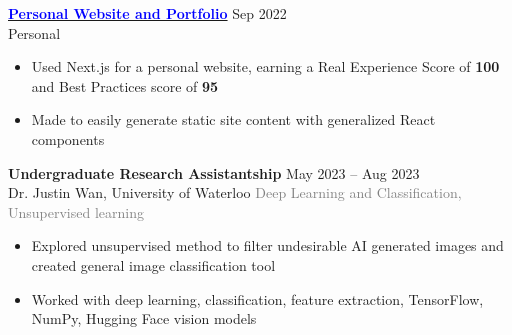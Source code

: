 \documentclass[10pt]{developercv} %
\begin{document}
\begin{minipage}[t]{\textwidth}
	\textbf{\href{https://henryhu.dev}{\textcolor{blue}{Personal Website and Portfolio}}} \hfill Sep 2022\\
	Personal
	\begin{itemize}[noitemsep,topsep=0pt]
		\item Used Next.js for a personal website, earning a Real Experience Score of \textbf{100} and Best Practices score of \textbf{95}
		\item Made to easily generate static site content with generalized React components
	\end{itemize}
	\vspace{0.3em}

\end{minipage}


\begin{minipage}[t]{\textwidth}
	\vspace{-\baselineskip}
	\textbf{Undergraduate Research Assistantship} \hfill May 2023 -- Aug 2023\\
	Dr. Justin Wan, \; University of Waterloo \hfill \textcolor{gray}{Deep Learning and Classification, Unsupervised learning}
	\begin{itemize}[noitemsep,topsep=0pt]
		\item Explored unsupervised method to filter undesirable AI generated images and created general image classification tool
		\item Worked with deep learning, classification, feature extraction, TensorFlow, NumPy, Hugging Face vision models
	\end{itemize}
\end{minipage}
\end{document}
